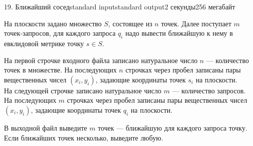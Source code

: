 \begin{problem}{19. Ближайший сосед}{standard input}{standard output}{2 секунды}{256 мегабайт}

На плоскости задано множество $S$, состоящее из $n$ точек. Далее поступает $m$ точек-запросов, для каждого запроса $q_i$ надо вывести ближайшую к нему в евклидовой метрике точку $s \in S$.

\InputFile

На первой строчке входного файла записано натуральное число $n$ — количество точек в множестве. На последующих $n$ строчках через пробел записаны пары вещественных чисел $(x_i, y_i)$, задающие координаты точек $s_i$ на плоскости. \\
На следующей строчке записано натуральное число $m$ — количество запросов. На последующих $m$ строчках через пробел записаны пары вещественных чисел $(x_i, y_i)$, задающие координаты точек $q_i$ на плоскости. 

\OutputFile
В выходной файл выведите $m$ точек — ближайшую для каждого запроса точку. Если ближайших точек несколько, выведите любую.

\Examples

\begin{example}%
%
%
\end{example}

\end{problem}
